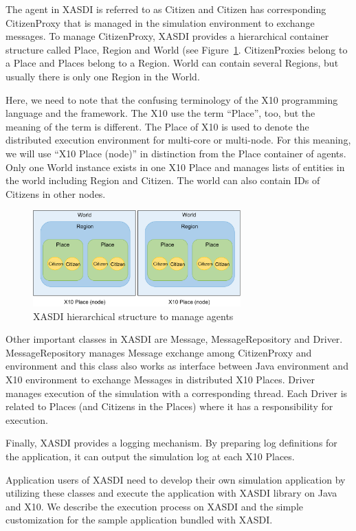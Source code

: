 The agent in XASDI is referred to as Citizen and Citizen has corresponding CitizenProxy that is managed in the simulation environment to exchange messages.
To manage CitizenProxy, XASDI provides a hierarchical container structure called Place, Region and World (see Figure~\ref{fig:Figs.mizuta/xasdiclass}. CitizenProxies belong to a Place and Places belong to a Region. World can contain several Regions, but usually there is only one Region in the World.


Here, we need to note that the confusing terminology of the X10 programming language and the framework.
The X10 use the term ``Place'', too, but the meaning of the term is different.
The Place of X10 is used to denote the distributed execution environment for multi-core or multi-node.
For this meaning, we will use ``X10 Place (node)'' in distinction from the Place container of agents.
Only one World instance exists in one X10 Place and manages lists of entities in the world including Region and Citizen.
The world can also contain IDs of Citizens in other nodes.

\begin{figure}[h]
  \centering
  \includegraphics[width=8cm]{Figs.mizuta/xasdiclass.pdf}
  \caption{XASDI hierarchical structure to manage agents}
  \label{fig:Figs.mizuta/xasdiclass}
\end{figure}

Other important classes in XASDI are Message, MessageRepository and Driver.
MessageRepository manages Message exchange among CitizenProxy and environment and this class also works as interface between Java environment and X10 environment to exchange Messages in distributed X10 Places.
Driver manages execution of the simulation with a corresponding thread. Each Driver is related to Places (and Citizens in the Places) where it has a responsibility for execution.

Finally, XASDI provides a logging mechanism. By preparing log definitions for the application, it can output the simulation log at each X10 Places. 


Application users of XASDI need to develop their own simulation application by utilizing these classes and execute the application with XASDI library on Java and X10.
We describe the execution process on XASDI and the simple customization for the sample application bundled with XASDI.

